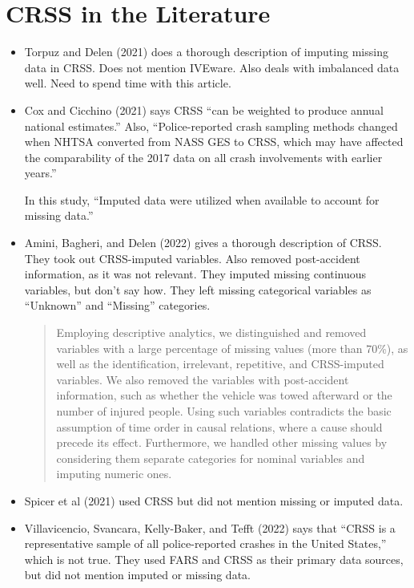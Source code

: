 \section{CRSS in the Literature}
\label{sec:CRSS_Literature}

\begin{itemize}
	\item Torpuz and Delen (2021) \cite{TOPUZ2021113557} does a thorough description of imputing missing data in CRSS.  Does not mention IVEware.  Also deals with imbalanced data well.  Need to spend time with this article. 

	\item Cox and Cicchino (2021) \cite{COX2021288} says CRSS ``can be
weighted to produce annual national estimates.''  Also, ``Police-reported
crash sampling methods changed when NHTSA converted from
NASS GES to CRSS, which may have affected the comparability of
the 2017 data on all crash involvements with earlier years.''
	
	In this study, 
	``Imputed data were utilized when available to account for missing data.''
	
	\item Amini, Bagheri, and Delen (2022) \cite{AMINI2022108720} gives a thorough description of CRSS.  They took out CRSS-imputed variables.  Also removed post-accident information, as it was not relevant.  They imputed missing continuous variables, but don't say how.  They left missing categorical variables as ``Unknown'' and ``Missing'' categories.  
	
\begin{quote}
	Employing descriptive analytics, we distinguished and removed
variables with a large percentage of missing values (more than 70\%), as
well as the identification, irrelevant, repetitive, and CRSS-imputed
variables. We also removed the variables with post-accident information,
such as whether the vehicle was towed afterward or the number of
injured people. Using such variables contradicts the basic assumption of
time order in causal relations, where a cause should precede its effect.
Furthermore, we handled other missing values by considering them
separate categories for nominal variables and imputing numeric ones.
\end{quote}	

	\item Spicer et al (2021) \cite{SPICER2021105974} used CRSS but did not mention missing or imputed data.  
	
	\item Villavicencio, Svancara, Kelly-Baker, and Tefft (2022) \cite{VILLAVICENCIO2022757} says that ``CRSS is a representative
sample of all police-reported crashes in the United States,'' which is not true.  They used FARS and CRSS as their primary data sources, but did not mention imputed or missing data.  
	

\end{itemize}
